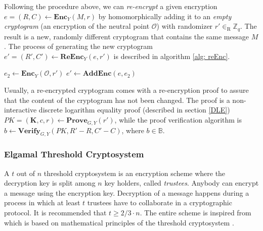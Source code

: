 Following the procedure above, we can \textit{re-encrypt} a given encryption \( e = (R, C) \leftarrow \mathbf{Enc}_Y (M, r) \) by homomorphically adding it to an \textit{empty cryptogram} (an encryption of the neutral point $\mathcal{O}$) with randomizer \( r' \in_\mathrm{R} \mathbb{Z}_q \). The result is a new, randomly different cryptogram that contains the same message $M$. The process of generating the new cryptogram \( e' = (R', C') \leftarrow \mathbf{ReEnc}_Y (e, r') \) is described in algorithm \ref{alg: reEnc}.

\begin{algorithm}[H]
\DontPrintSemicolon
    \caption{\( \mathbf{ReEnc}_Y (e, r') \)}
    \( e_2 \gets \mathbf{Enc}_Y (\mathcal{O}, r') \) 
    \( e' \gets \mathbf{AddEnc} (e, e_2) \) 
     
\end{algorithm}



Usually, a re-encrypted cryptogram comes with a re-encryption proof to assure that the content of the cryptogram has not been changed. The proof is a non-interactive discrete logarithm equality proof (described in section \ref{DLE}) \( PK = (\boldsymbol{K}, c, r) \leftarrow \mathbf{Prove}_{G, Y} (r') \), while the proof verification algorithm is \( b \leftarrow \mathbf{Verify}_{G, Y} (PK, R'-R, C'-C) \), where \( b \in \mathbb{B} \).

\subsubsection{Elgamal Threshold Cryptosystem}
A $t$ out of $n$ threshold cryptosystem is an encryption scheme where the decryption key is split among $n$ key holders, called \textit{trustees}. Anybody can encrypt a message using the encryption key. Decryption of a message happens during a process in which at least $t$ trustees have to collaborate in a cryptographic protocol. It is recommended that \( t \geq 2/3 \cdot n \). The entire scheme is inspired from \cite{Pedersen91} which is based on mathematical principles of the threshold cryptosystem \cite{Desmedt89, Shamir79}.


